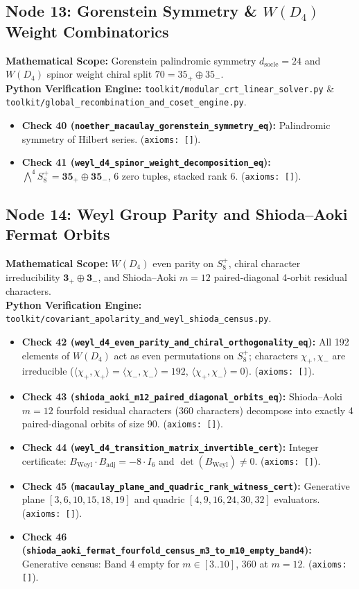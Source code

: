 \documentclass[11pt,a4paper]{article}
\begin{document}
\subsection{Node 13: Gorenstein Symmetry \& $W(D_4)$ Weight Combinatorics}
\textbf{Mathematical Scope:} Gorenstein palindromic symmetry $d_{\mathrm{socle}}=24$ and $W(D_4)$ spinor weight chiral split $70 = 35_+ \oplus 35_-$.\\
\textbf{Python Verification Engine:} \texttt{toolkit/modular\_crt\_linear\_solver.py} \& \texttt{toolkit/global\_recombination\_and\_coset\_engine.py}.
\begin{itemize}[leftmargin=1.5em]
\item \textbf{Check 40 (\texttt{noether\_macaulay\_gorenstein\_symmetry\_eq}):} Palindromic symmetry of Hilbert series. (\texttt{axioms: []}).
\item \textbf{Check 41 (\texttt{weyl\_d4\_spinor\_weight\_decomposition\_eq}):} $\bigwedge^4 S^+_8 = \mathbf{35}_+ \oplus \mathbf{35}_-$, 6 zero tuples, stacked rank 6. (\texttt{axioms: []}).
\end{itemize}

\subsection{Node 14: Weyl Group Parity and Shioda--Aoki Fermat Orbits}
\textbf{Mathematical Scope:} $W(D_4)$ even parity on $S^+_8$, chiral character irreducibility $\mathbf{3}_+ \oplus \mathbf{3}_-$, and Shioda--Aoki $m=12$ paired-diagonal 4-orbit residual characters.\\
\textbf{Python Verification Engine:} \texttt{toolkit/covariant\_apolarity\_and\_weyl\_shioda\_census.py}.
\begin{itemize}[leftmargin=1.5em]
\item \textbf{Check 42 (\texttt{weyl\_d4\_even\_parity\_and\_chiral\_orthogonality\_eq}):} All 192 elements of $W(D_4)$ act as even permutations on $S^+_8$; characters $\chi_+,\chi_-$ are irreducible ($\langle \chi_+, \chi_+ \rangle = \langle \chi_-, \chi_- \rangle = 192$, $\langle \chi_+, \chi_- \rangle = 0$). (\texttt{axioms: []}).
\item \textbf{Check 43 (\texttt{shioda\_aoki\_m12\_paired\_diagonal\_orbits\_eq}):} Shioda--Aoki $m=12$ fourfold residual characters (360 characters) decompose into exactly 4 paired-diagonal orbits of size 90. (\texttt{axioms: []}).
\item \textbf{Check 44 (\texttt{weyl\_d4\_transition\_matrix\_invertible\_cert}):} Integer certificate: $B_{\mathrm{Weyl}} \cdot B_{\mathrm{adj}} = -8 \cdot I_6$ and $\det(B_{\mathrm{Weyl}}) \neq 0$. (\texttt{axioms: []}).
\item \textbf{Check 45 (\texttt{macaulay\_plane\_and\_quadric\_rank\_witness\_cert}):} Generative plane $[3,6,10,15,18,19]$ and quadric $[4,9,16,24,30,32]$ evaluators. (\texttt{axioms: []}).
\item \textbf{Check 46 (\texttt{shioda\_aoki\_fermat\_}\allowbreak\texttt{fourfold\_census\_m3\_to\_m10\_empty\_band4}):} Generative census: Band 4 empty for $m \in [3..10]$, 360 at $m=12$. (\texttt{axioms: []}).
\end{itemize}
\end{document}
